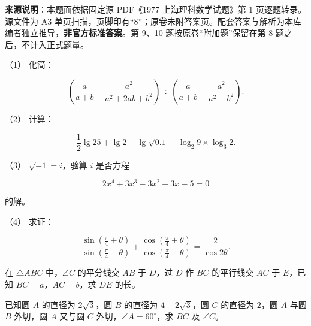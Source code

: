 

\begin{gktip}
\textbf{来源说明}：本题面依据固定源 PDF《1977 上海理科数学试题》第 1 页逐题转录。源文件为 A3 单页扫描，页脚印有“8”；原卷未附答案页。配套答案与解析为本库编者独立推导，\textbf{非官方标准答案}。第 9、10 题按原卷“附加题”保留在第 8 题之后，不计入正式题量。
\end{gktip}

\par\medskip

\begin{question}

（1） 化简：

\nopagebreak[4]
\[
\left(\frac{a}{a+b}-\frac{a^2}{a^2+2ab+b^2}\right)\div\left(\frac{a}{a+b}-\frac{a^2}{a^2-b^2}\right).
\]

（2） 计算：

\nopagebreak[4]
\[
\frac12\lg25+\lg2-\lg\sqrt{0.1}-\log_2 9\times\log_3 2.
\]

（3） $\sqrt{-1}=i$，验算 $i$ 是否方程

\nopagebreak[4]
\[
2x^4+3x^3-3x^2+3x-5=0
\]

的解。

（4） 求证：

\nopagebreak[4]
\[
\frac{\sin\left(\frac\pi4+\theta\right)}{\sin\left(\frac\pi4-\theta\right)}+\frac{\cos\left(\frac\pi4+\theta\right)}{\cos\left(\frac\pi4-\theta\right)}=\frac{2}{\cos2\theta}.
\]

\Needspace{0.4\textheight}
\end{question}
\begin{question}
在 $\triangle ABC$ 中，$\angle C$ 的平分线交 $AB$ 于 $D$，过 $D$ 作 $BC$ 的平行线交 $AC$ 于 $E$，已知 $BC=a$，$AC=b$，求 $DE$ 的长。
\nopagebreak[4]
\begin{center}\end{center}
\nopagebreak[4]
\end{question}
\begin{question}
已知圆 $A$ 的直径为 $2\sqrt3$，圆 $B$ 的直径为 $4-2\sqrt3$，圆 $C$ 的直径为 $2$，圆 $A$ 与圆 $B$ 外切，圆 $A$ 又与圆 $C$ 外切，$\angle A=60^\circ$，求 $BC$ 及 $\angle C$。

\end{question}

